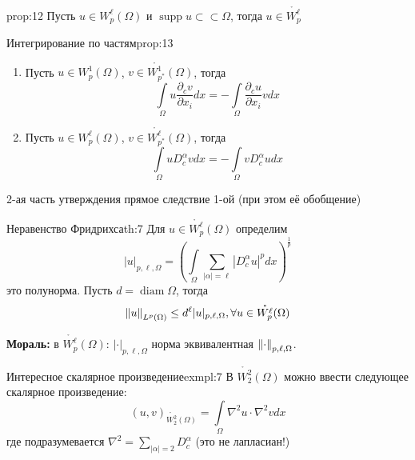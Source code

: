 \documentclass[12pt,a4paper]{article}
\newcommand{\intset}[1]{\int\limits_{#1}}
\newcommand{\ssubset}{\subset \subset}
\DeclareMathOperator\supp{supp}
\DeclareMathOperator\diam{diam}
\begin{document}
\begin{proposition}{}{prop:12}
	Пусть $u \in W_p^\ell (\Omega)$ и $\supp{u} \ssubset \Omega$, тогда $u \in \mathring{W_p^\ell}$
\end{proposition}

\begin{proposition}{Интегрирование по частям}{prop:13}
	\begin{enumerate}
		\item Пусть $u \in W_p^1 (\Omega)$, $v \in \mathring{W_{p^*}^1} (\Omega)$, тогда
			\begin{equation*}
			\intset{\Omega}{u \frac{\partial_c v}{\partial x_i} dx} = -\intset{\Omega}{\frac{\partial_c u}{\partial x_i} v dx}
			\end{equation*}
		\item Пусть $u \in W_p^\ell (\Omega)$, $v \in \mathring{W_{p^*}^\ell} (\Omega)$, тогда
			\begin{equation*}
			\intset{\Omega}{u D_c^\alpha v dx} = -\intset{\Omega}{v D_c^\alpha u dx}
			\end{equation*}
	\end{enumerate}
	2-ая часть утверждения прямое следствие 1-ой (при этом её обобщение)
\end{proposition}

\begin{theorem}{Неравенство Фридрихса}{th:7}
	Для $u \in \mathring{W_p^\ell} (\Omega)$ определим 
	\begin{equation*}
		|u|_{p, \ell, \Omega} = \left(\intset{\Omega}{\sum_{|\alpha| = \ell}{|D_c^\alpha u|^p} dx}\right)^{\frac{1}{p}}
	\end{equation*}
	это полунорма. Пусть $d = \diam{\Omega}$, тогда
	\begin{equation*}
		\norm{u}_{L^p (\Omega)} \leq d^\ell |u|_{p, \ell, \Omega}, \forall u \in \mathring{W_p^\ell} (\Omega)
	\end{equation*}
\end{theorem}
\textbf{Мораль:} в $\mathring{W_p^\ell} (\Omega)$: $|\cdot|_{p, \ell, \Omega}$ норма эквивалентная $\norm{\cdot}_{p, \ell, \Omega}$.

\begin{example}{Интересное скалярное произведение}{exmpl:7}
	В $\mathring{W_2^2} (\Omega)$ можно ввести следующее скалярное произведение:
	\begin{equation*}
		(u, v)_{\mathring{W_2^2} (\Omega)} = \intset{\Omega}{\nabla^2 u \cdot \nabla^2 v dx}
	\end{equation*}
	где подразумевается $\nabla^2 = \sum\limits_{|\alpha| = 2}{D_c^\alpha}$ (это не лапласиан!)
\end{example}
\end{document}
